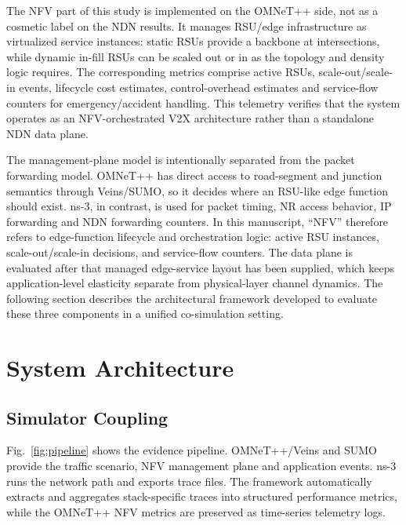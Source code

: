 \documentclass[journal]{IEEEtran}
\begin{document}
The NFV part of this study is implemented on the OMNeT++ side, not as a cosmetic label on the NDN results. It manages RSU/edge infrastructure as virtualized service instances: static RSUs provide a backbone at intersections, while dynamic in-fill RSUs can be scaled out or in as the topology and density logic requires. The corresponding metrics comprise active RSUs, scale-out/scale-in events, lifecycle cost estimates, control-overhead estimates and service-flow counters for emergency/accident handling. This telemetry verifies that the system operates as an NFV-orchestrated V2X architecture rather than a standalone NDN data plane.

The management-plane model is intentionally separated from the packet forwarding model. OMNeT++ has direct access to road-segment and junction semantics through Veins/SUMO, so it decides where an RSU-like edge function should exist. ns-3, in contrast, is used for packet timing, NR access behavior, IP forwarding and NDN forwarding counters. In this manuscript, ``NFV'' therefore refers to edge-function lifecycle and orchestration logic: active RSU instances, scale-out/scale-in decisions, and service-flow counters. The data plane is evaluated after that managed edge-service layout has been supplied, which keeps application-level elasticity separate from physical-layer channel dynamics. The following section describes the architectural framework developed to evaluate these three components in a unified co-simulation setting.

\section{System Architecture}
\label{sec:system}

\subsection{Simulator Coupling}

Fig.~\ref{fig:pipeline} shows the evidence pipeline. OMNeT++/Veins and SUMO provide the traffic scenario, NFV management plane and application events. ns-3 runs the network path and exports trace files. The framework automatically extracts and aggregates stack-specific traces into structured performance metrics, while the OMNeT++ NFV metrics are preserved as time-series telemetry logs.
\end{document}
